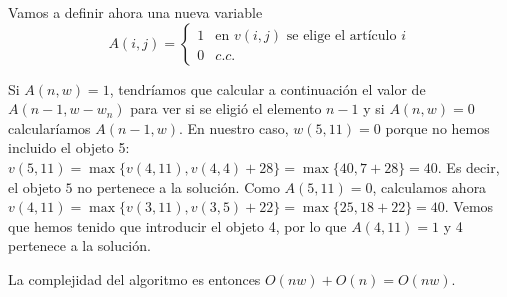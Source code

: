 \documentclass[AL.tex]{subfiles}
\begin{document}
\begin{ej}
Vamos a definir ahora una nueva variable
\[
A(i,j)=\begin{cases}
1 & \text{en }v(i,j)\text{ se elige el artículo }i\\
0 & c.c.
\end{cases}
\] 

Si $A(n,w)=1$, tendríamos que calcular a continuación el valor de $A(n-1, w-w_n)$ para ver si se eligió el elemento $n-1$ y si $A(n,w)=0$ calcularíamos $A(n-1,w)$. En nuestro caso, $w(5, 11)=0$ porque no hemos incluido el objeto 5: $v(5,11)=\max\{v(4,11),v(4,4)+28\}=\max\{40,7+28\}=40$. Es decir, el objeto $5$ no pertenece a la solución. Como $A(5,11)=0$, calculamos ahora $v(4,11)=\max\{v(3,11), v(3,5)+22\}=\max\{25, 18+22\}=40$. Vemos que hemos tenido que introducir el objeto 4, por lo que $A(4,11)=1$ y 4 pertenece a la solución.

La complejidad del algoritmo es entonces $O(nw)+O(n)=O(nw)$. 
\end{ej}
\end{document}
